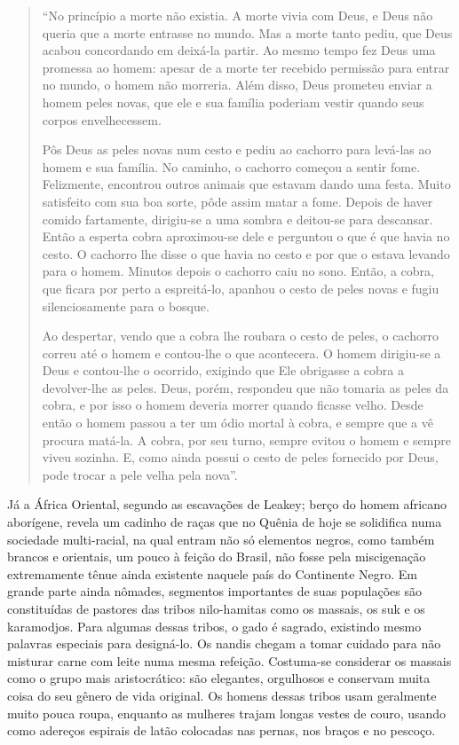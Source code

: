 \documentclass[
  letterpaper,
  DIV=11,
  numbers=noendperiod]{scrreprt}
\begin{document}
\begin{quote}
``No princípio a morte não existia. A morte vivia com Deus, e Deus não
queria que a morte entrasse no mundo. Mas a morte tanto pediu, que Deus
acabou concordando em deixá-la partir. Ao mesmo tempo fez Deus uma
promessa ao homem: apesar de a morte ter recebido permissão para entrar
no mundo, o homem não morreria. Além disso, Deus prometeu enviar a homem
peles novas, que ele e sua família poderiam vestir quando seus corpos
envelhecessem.

Pôs Deus as peles novas num cesto e pediu ao cachorro para levá-las ao
homem e sua família. No caminho, o cachorro começou a sentir fome.
Felizmente, encontrou outros animais que estavam dando uma festa. Muito
satisfeito com sua boa sorte, pôde assim matar a fome. Depois de haver
comido fartamente, dirigiu-se a uma sombra e deitou-se para descansar.
Então a esperta cobra aproximou-se dele e perguntou o que é que havia no
cesto. O cachorro lhe disse o que havia no cesto e por que o estava
levando para o homem. Minutos depois o cachorro caiu no sono. Então, a
cobra, que ficara por perto a espreitá-lo, apanhou o cesto de peles
novas e fugiu silenciosamente para o bosque.

Ao despertar, vendo que a cobra lhe roubara o cesto de peles, o cachorro
correu até o homem e contou-lhe o que acontecera. O homem dirigiu-se a
Deus e contou-lhe o ocorrido, exigindo que Ele obrigasse a cobra a
devolver-lhe as peles. Deus, porém, respondeu que não tomaria as peles
da cobra, e por isso o homem deveria morrer quando ficasse velho. Desde
então o homem passou a ter um ódio mortal à cobra, e sempre que a vê
procura matá-la. A cobra, por seu turno, sempre evitou o homem e sempre
viveu sozinha. E, como ainda possui o cesto de peles fornecido por Deus,
pode trocar a pele velha pela nova''.
\end{quote}

Já a África Oriental, segundo as escavações de Leakey; berço do homem
africano aborígene, revela um cadinho de raças que no Quênia de hoje se
solidifica numa sociedade multi-racial, na qual entram não só elementos
negros, como também brancos e orientais, um pouco à feição do Brasil,
não fosse pela miscigenação extremamente tênue ainda existente naquele
país do Continente Negro. Em grande parte ainda nômades, segmentos
importantes de suas populações são constituídas de pastores das tribos
nilo-hamitas como os massais, os suk e os karamodjos. Para algumas
dessas tribos, o gado é sagrado, existindo mesmo palavras especiais para
designá-lo. Os nandis chegam a tomar cuidado para não misturar carne com
leite numa mesma refeição. Costuma-se considerar os massais como o grupo
mais aristocrático: são elegantes, orgulhosos e conservam muita coisa do
seu gênero de vida original. Os homens dessas tribos usam geralmente
muito pouca roupa, enquanto as mulheres trajam longas vestes de couro,
usando como adereços espirais de latão colocadas nas pernas, nos braços
e no pescoço.
\end{document}
